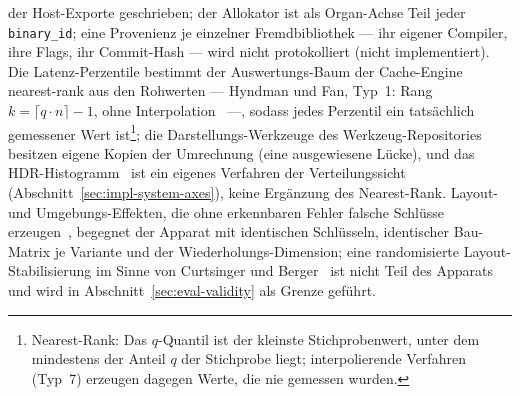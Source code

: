 \begin{nurlang}
der Host-Exporte geschrieben; der Allokator ist als Organ-Achse Teil jeder \texttt{binary\_id}; eine
Provenienz je einzelner Fremdbibliothek --- ihr eigener Compiler, ihre Flags, ihr Commit-Hash --- wird
nicht protokolliert (nicht implementiert). Die Latenz-Perzentile bestimmt der Auswertungs-Baum der Cache-Engine
nearest-rank aus den Rohwerten --- Hyndman und Fan, Typ~1: Rang $k = \lceil q \cdot n \rceil - 1$,
ohne Interpolation~\cite{hyndman1996quantiles} ---, sodass jedes Perzentil ein tatsächlich gemessener Wert
ist\footnote{Nearest-Rank: Das $q$-Quantil ist der kleinste Stichprobenwert, unter dem mindestens der
Anteil $q$ der Stichprobe liegt; interpolierende Verfahren (Typ~7) erzeugen dagegen Werte, die nie
gemessen wurden.}; die Darstellungs-Werkzeuge des Werkzeug-Repositories besitzen eigene Kopien der
Umrechnung (eine ausgewiesene Lücke), und das HDR-Histogramm~\cite{tene_hdrhistogram} ist ein eigenes
Verfahren der Verteilungssicht (Abschnitt~\ref{sec:impl-system-axes}), keine Ergänzung des
Nearest-Rank. Layout- und Umgebungs-Effekten, die ohne erkennbaren Fehler falsche Schlüsse
erzeugen~\cite{mytkowicz2009wrongdata}, begegnet der Apparat mit identischen Schlüsseln, identischer
Bau-Matrix je Variante und der Wiederholungs-Dimension; eine randomisierte Layout-Stabilisierung im
Sinne von Curtsinger und Berger~\cite{curtsinger2013stabilizer} ist nicht Teil des Apparats und wird
in Abschnitt~\ref{sec:eval-validity} als Grenze geführt.
\end{nurlang}
